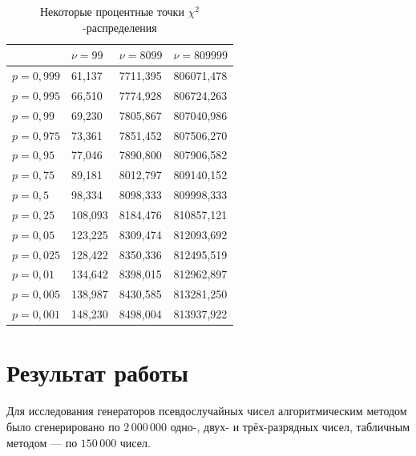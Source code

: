\documentclass[a4paper,oneside,12pt]{extreport}
\begin{document}
\begin{table}[H]
	\centering
	\caption{Некоторые процентные точки $\chi^2$-распределения}
	\label{tbl:chi-squared}
	\begin{tabular}{|l|l|l|l|}
		\hline
		            & $\nu = 99$ & $\nu = 8099$ & $\nu = 809999$ \\ \hline
		$p = 0,999$ & 61,137     & 7711,395     & 806071,478     \\ \hline
		$p = 0,995$ & 66,510     & 7774,928     & 806724,263     \\ \hline
		$p = 0,99$  & 69,230     & 7805,867     & 807040,986     \\ \hline
		$p = 0,975$ & 73,361     & 7851,452     & 807506,270     \\ \hline
		$p = 0,95$  & 77,046     & 7890,800     & 807906,582     \\ \hline
		$p = 0,75$  & 89,181     & 8012,797     & 809140,152     \\ \hline
		$p = 0,5$   & 98,334     & 8098,333     & 809998,333     \\ \hline
		$p = 0,25$  & 108,093    & 8184,476     & 810857,121     \\ \hline
		$p = 0,05$  & 123,225    & 8309,474     & 812093,692     \\ \hline
		$p = 0,025$ & 128,422    & 8350,336     & 812495,519     \\ \hline
		$p = 0,01$  & 134,642    & 8398,015     & 812962,897     \\ \hline
		$p = 0,005$ & 138,987    & 8430,585     & 813281,250     \\ \hline
		$p = 0,001$ & 148,230    & 8498,004     & 813937,922     \\ \hline
	\end{tabular}
\end{table}

\chapter{Результат работы}

Для исследования генераторов псевдослучайных чисел алгоритмическим методом было сгенерировано по $2\,000\,000$ одно-, двух- и трёх-разрядных чисел, табличным методом — по $150\,000$ чисел.
\end{document}
